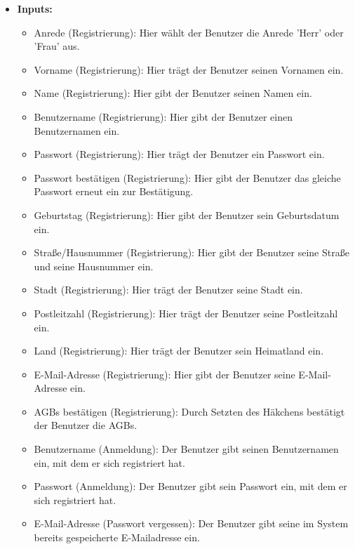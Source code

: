 \begin{itemize}
			\item \textbf{Inputs:}
			\begin{itemize}
				\item Anrede (Registrierung): Hier wählt der Benutzer die Anrede 'Herr' oder 'Frau' aus.
				\item Vorname (Registrierung): Hier trägt der Benutzer seinen Vornamen ein.
				\item Name (Registrierung): Hier gibt der Benutzer seinen Namen ein.
				\item Benutzername (Registrierung): Hier gibt der Benutzer einen Benutzernamen ein.
				\item Passwort (Registrierung): Hier trägt der Benutzer ein Passwort ein.
				\item Passwort bestätigen (Registrierung): Hier gibt der Benutzer das gleiche Passwort erneut ein zur Bestätigung.
				\item Geburtstag (Registrierung): Hier gibt der Benutzer sein Geburtsdatum ein.
				\item Straße/Hausnummer (Registrierung): Hier gibt der Benutzer seine Straße und seine Hausnummer ein.
				\item Stadt (Registrierung): Hier trägt der Benutzer seine Stadt ein.
				\item Postleitzahl (Registrierung): Hier trägt der Benutzer seine Postleitzahl ein.
				\item Land (Registrierung): Hier trägt der Benutzer sein Heimatland ein.
				\item E-Mail-Adresse (Registrierung): Hier gibt der Benutzer seine E-Mail-Adresse ein.
				\item AGBs bestätigen (Registrierung): Durch Setzten des Häkchens bestätigt der Benutzer die AGBs. 
				\item Benutzername (Anmeldung): Der Benutzer gibt seinen Benutzernamen ein, mit dem er sich registriert hat.
				\item Passwort (Anmeldung): Der Benutzer gibt sein Passwort ein, mit dem er sich registriert hat.
				\item E-Mail-Adresse (Passwort vergessen): Der Benutzer gibt seine im System bereits gespeicherte E-Mailadresse ein.
				
				\begin{center}
					\begin{longtable}{|p{3cm} |p{5cm} | p{4cm}|p{3cm}|}
						

\end{longtable}
\end{center}
\end{itemize}
\end{itemize}
